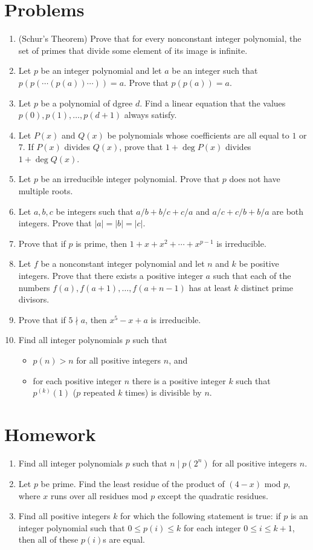 \documentclass{article}
\begin{document}
\section{Problems}
\begin{enumerate}
  \item (Schur's Theorem) Prove that for every nonconstant integer polynomial,
    the set of primes that divide some element of its image is infinite.
  \item Let $p$ be an integer polynomial and let $a$ be an integer such that
    $p(p(\cdots(p(a))\cdots))=a$. Prove that $p(p(a))=a$.
  \item Let $p$ be a polynomial of dgree $d$. Find a linear
    equation that the values $p(0),p(1),\ldots,p(d+1)$ always satisfy.
  \item Let $P(x)$ and $Q(x)$ be polynomials whose coefficients are all equal to
    $1$ or $7$. If $P(x)$ divides $Q(x)$, prove that $1+\deg P(x)$ divides
    $1+\deg Q(x)$.
  \item Let $p$ be an irreducible integer polynomial. Prove that $p$ does not
    have multiple roots.
  \item Let $a,b,c$ be integers such that $a/b+b/c+c/a$ and $a/c+c/b+b/a$ are
    both integers. Prove that $|a|=|b|=|c|$.
  \item Prove that if $p$ is prime, then $1+x+x^2+\cdots+x^{p-1}$ is
    irreducible.
  \item Let $f$ be a nonconstant integer polynomial and let $n$ and $k$ be
    positive integers. Prove that there exists a positive integer $a$ such that
    each of the numbers $f(a),f(a+1),\ldots,f(a+n-1)$ has at least $k$ distinct
    prime divisors.
  \item Prove that if $5\nmid a$, then $x^5-x+a$ is irreducible.
  \item Find all integer polynomials $p$ such that
    \begin{itemize}
      \item $p(n)>n$ for all positive integers $n$, and
      \item for each positive integer $n$ there is a positive integer $k$ such
        that $p^{(k)}(1)$ ($p$ repeated $k$ times) is divisible by $n$.
    \end{itemize}
\end{enumerate}
\newpage
\section{Homework}
\begin{enumerate}
  \item Find all integer polynomials $p$ such that $n\mid p(2^n)$ for all
    positive integers $n$.
  \item Let $p$ be prime. Find the least residue of the product of $(4-x)$ mod $p$, where $x$ runs
    over all residues mod $p$ except the quadratic residues.
  \item Find all positive integers $k$ for which the following statement is
    true: if $p$ is an integer polynomial such that $0\le p(i)\le k$ for each
    integer $0\le i\le k+1$, then all of these $p(i)$s are equal.
\end{enumerate}
\end{document}
